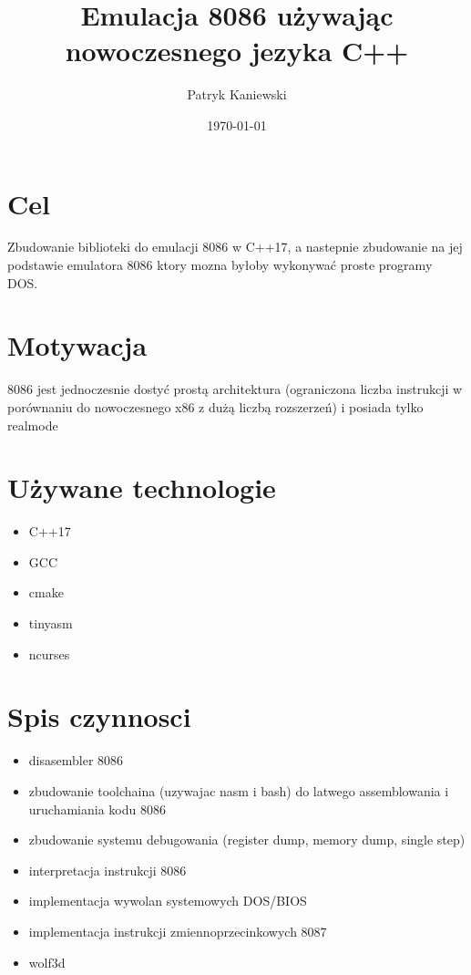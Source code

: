 \documentclass[11pt]{article}
\author{Patryk Kaniewski}
\date{\today}
\title{Emulacja 8086 używając nowoczesnego jezyka C++}
\begin{document}
\maketitle

\section{Cel}
\label{sec:org42f9c59}
Zbudowanie biblioteki do emulacji 8086 w C++17, a nastepnie zbudowanie na jej podstawie emulatora 8086 ktory mozna byłoby wykonywać proste programy DOS.
\section{Motywacja}
\label{sec:orgf9c36b1}
8086 jest jednoczesnie dostyć prostą architektura (ograniczona liczba instrukcji w porównaniu do nowoczesnego x86 z dużą liczbą rozszerzeń) i posiada tylko realmode
\section{Używane technologie}
\label{sec:org67100b1}
\begin{itemize}
\item C++17
\item GCC
\item cmake
\item tinyasm
\item ncurses
\end{itemize}
\section{Spis czynnosci}
\label{sec:org80575b2}
\begin{itemize}
\item disasembler 8086
\item zbudowanie toolchaina (uzywajac nasm i bash) do latwego assemblowania i uruchamiania kodu 8086
\item zbudowanie systemu debugowania (register dump, memory dump, single step)
\item interpretacja instrukcji 8086
\item implementacja wywolan systemowych DOS/BIOS
\item implementacja instrukcji zmiennoprzecinkowych 8087
\item wolf3d
\end{itemize}
\end{document}
